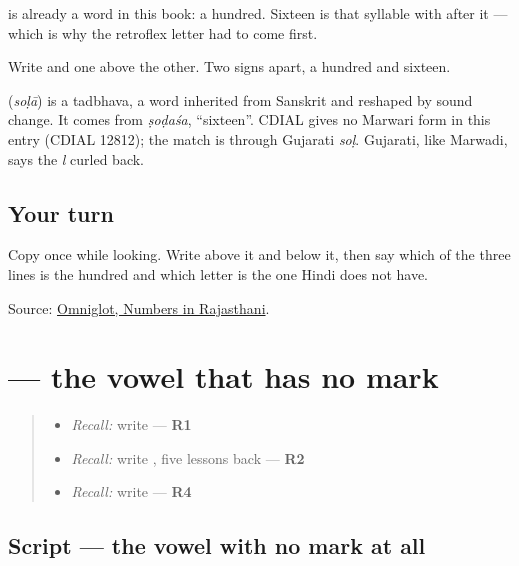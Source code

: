 \textbf{} is already a word in this book: a hundred. Sixteen is that syllable with \textbf{} after it — which is why the retroflex letter had to come first.

Write \textbf{} and \textbf{} one above the other. Two signs apart, a hundred and sixteen.

\begin{cousinweb}
\textbf{} (\emph{soḷā}) is a tadbhava, a word inherited from Sanskrit and reshaped by sound change. It comes from \emph{ṣoḍaśa}, \textquotedblleft{}sixteen\textquotedblright{}. CDIAL gives no Marwari form in this entry (CDIAL 12812); the match is through Gujarati \emph{soḷ}. Gujarati, like Marwadi, says the \emph{l} curled back.
\end{cousinweb}

\subsection*{Your turn}
Copy \textbf{} once while looking. Write \textbf{} above it and \textbf{} below it, then say which of the three lines is the hundred and which letter is the one Hindi does not have.

\begin{tcolorbox}[breakable,colback=teal!4,colframe=teal!35!black,title={Before you move on}]
Source: \href{https://www.omniglot.com/language/numbers/rajasthani.htm}{Omniglot, Numbers in Rajasthani}.
\end{tcolorbox}
\section[\texorpdfstring{\mw{अ} (a)}{अ (a)}]{ — the vowel that has no mark}

\label{lesson:MW-W38-a}



\begin{quote}
\begin{itemize}
\raggedright
  \item \emph{Recall:} write \textbf{} — \textbf{R1}
  \item \emph{Recall:} write \textbf{}, five lessons back — \textbf{R2}
  \item \emph{Recall:} write \textbf{ } — \textbf{R4}
\end{itemize}
\end{quote}

\subsection*{Script — the vowel with no mark at all}

